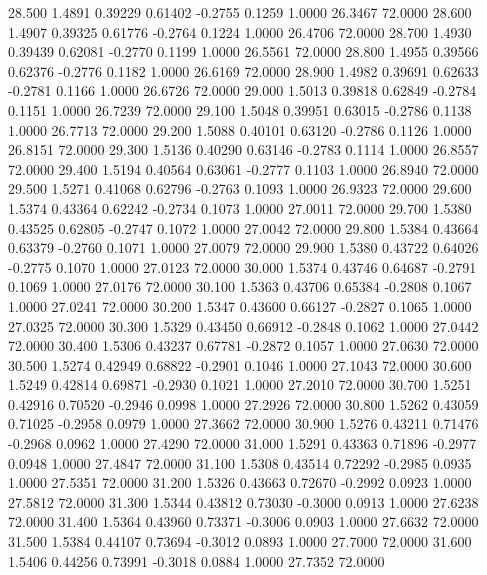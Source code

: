   28.500   1.4891   0.39229   0.61402  -0.2755   0.1259   1.0000  26.3467  72.0000
  28.600   1.4907   0.39325   0.61776  -0.2764   0.1224   1.0000  26.4706  72.0000
  28.700   1.4930   0.39439   0.62081  -0.2770   0.1199   1.0000  26.5561  72.0000
  28.800   1.4955   0.39566   0.62376  -0.2776   0.1182   1.0000  26.6169  72.0000
  28.900   1.4982   0.39691   0.62633  -0.2781   0.1166   1.0000  26.6726  72.0000
  29.000   1.5013   0.39818   0.62849  -0.2784   0.1151   1.0000  26.7239  72.0000
  29.100   1.5048   0.39951   0.63015  -0.2786   0.1138   1.0000  26.7713  72.0000
  29.200   1.5088   0.40101   0.63120  -0.2786   0.1126   1.0000  26.8151  72.0000
  29.300   1.5136   0.40290   0.63146  -0.2783   0.1114   1.0000  26.8557  72.0000
  29.400   1.5194   0.40564   0.63061  -0.2777   0.1103   1.0000  26.8940  72.0000
  29.500   1.5271   0.41068   0.62796  -0.2763   0.1093   1.0000  26.9323  72.0000
  29.600   1.5374   0.43364   0.62242  -0.2734   0.1073   1.0000  27.0011  72.0000
  29.700   1.5380   0.43525   0.62805  -0.2747   0.1072   1.0000  27.0042  72.0000
  29.800   1.5384   0.43664   0.63379  -0.2760   0.1071   1.0000  27.0079  72.0000
  29.900   1.5380   0.43722   0.64026  -0.2775   0.1070   1.0000  27.0123  72.0000
  30.000   1.5374   0.43746   0.64687  -0.2791   0.1069   1.0000  27.0176  72.0000
  30.100   1.5363   0.43706   0.65384  -0.2808   0.1067   1.0000  27.0241  72.0000
  30.200   1.5347   0.43600   0.66127  -0.2827   0.1065   1.0000  27.0325  72.0000
  30.300   1.5329   0.43450   0.66912  -0.2848   0.1062   1.0000  27.0442  72.0000
  30.400   1.5306   0.43237   0.67781  -0.2872   0.1057   1.0000  27.0630  72.0000
  30.500   1.5274   0.42949   0.68822  -0.2901   0.1046   1.0000  27.1043  72.0000
  30.600   1.5249   0.42814   0.69871  -0.2930   0.1021   1.0000  27.2010  72.0000
  30.700   1.5251   0.42916   0.70520  -0.2946   0.0998   1.0000  27.2926  72.0000
  30.800   1.5262   0.43059   0.71025  -0.2958   0.0979   1.0000  27.3662  72.0000
  30.900   1.5276   0.43211   0.71476  -0.2968   0.0962   1.0000  27.4290  72.0000
  31.000   1.5291   0.43363   0.71896  -0.2977   0.0948   1.0000  27.4847  72.0000
  31.100   1.5308   0.43514   0.72292  -0.2985   0.0935   1.0000  27.5351  72.0000
  31.200   1.5326   0.43663   0.72670  -0.2992   0.0923   1.0000  27.5812  72.0000
  31.300   1.5344   0.43812   0.73030  -0.3000   0.0913   1.0000  27.6238  72.0000
  31.400   1.5364   0.43960   0.73371  -0.3006   0.0903   1.0000  27.6632  72.0000
  31.500   1.5384   0.44107   0.73694  -0.3012   0.0893   1.0000  27.7000  72.0000
  31.600   1.5406   0.44256   0.73991  -0.3018   0.0884   1.0000  27.7352  72.0000
